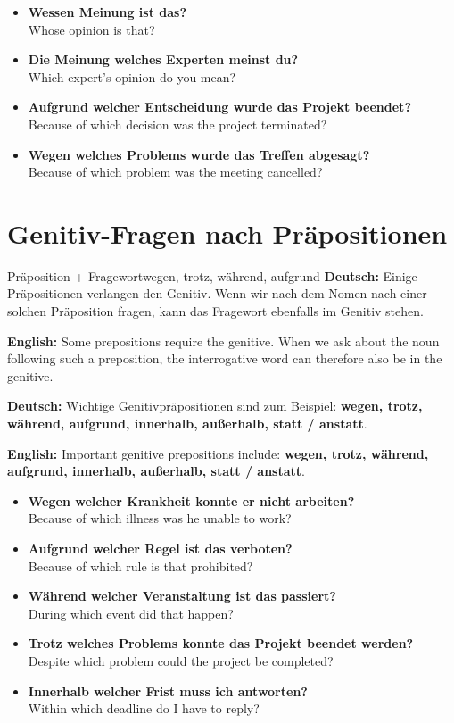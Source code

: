 \documentclass[a4paper,11pt]{article}
\newcommand{\GermanText}[1]{\textbf{Deutsch: }#1\par}
\newcommand{\EnglishText}[1]{{\small\color{SoftGray}\textbf{English: }#1\par}}
\newcommand{\ExampleItem}[2]{\item \textbf{#1}\\{\small\color{SoftGray}#2}}
\begin{document}
        \begin{exbox}
            \begin{itemize}
                \ExampleItem{Wessen Meinung ist das?}{Whose opinion is that?}
                
                \ExampleItem{Die Meinung welches Experten meinst du?}{Which expert's opinion do you mean?}
                
                \ExampleItem{Aufgrund welcher Entscheidung wurde das Projekt beendet?}{Because of which decision was the project terminated?}
                
                \ExampleItem{Wegen welches Problems wurde das Treffen abgesagt?}{Because of which problem was the meeting cancelled?}
            \end{itemize}
        \end{exbox}
    
    
    \section{Genitiv-Fragen nach Präpositionen}
        
        \begin{grammarentry}{Präposition + Fragewort}{wegen, trotz, während, aufgrund}
            \GermanText{Einige Präpositionen verlangen den Genitiv. Wenn wir nach dem Nomen nach einer solchen Präposition fragen, kann das Fragewort ebenfalls im Genitiv stehen.}
            \EnglishText{Some prepositions require the genitive. When we ask about the noun following such a preposition, the interrogative word can therefore also be in the genitive.}
            
            \GermanText{Wichtige Genitivpräpositionen sind zum Beispiel: \textbf{wegen, trotz, während, aufgrund, innerhalb, außerhalb, statt / anstatt}.}
            \EnglishText{Important genitive prepositions include: \textbf{wegen, trotz, während, aufgrund, innerhalb, außerhalb, statt / anstatt}.}
        \end{grammarentry}
        
        \begin{exbox}
            \begin{itemize}
                \ExampleItem{Wegen welcher Krankheit konnte er nicht arbeiten?}{Because of which illness was he unable to work?}
                
                \ExampleItem{Aufgrund welcher Regel ist das verboten?}{Because of which rule is that prohibited?}
                
                \ExampleItem{Während welcher Veranstaltung ist das passiert?}{During which event did that happen?}
                
                \ExampleItem{Trotz welches Problems konnte das Projekt beendet werden?}{Despite which problem could the project be completed?}
                
                \ExampleItem{Innerhalb welcher Frist muss ich antworten?}{Within which deadline do I have to reply?}
            \end{itemize}
        \end{exbox}
    
\end{document}
